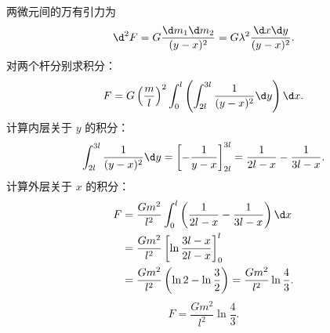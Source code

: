 \begin{solution}
    两微元间的万有引力为
    \begin{equation}
        \d^2 F = G \frac{\d m_1 \d m_2}{(y - x)^2} = G \lambda^2 \frac{\d x \d y}{(y - x)^2}.
    \end{equation}
    对两个杆分别求积分：
    \begin{equation}
        F = G \left(\frac{m}{l}\right)^2 \int_0^l \left( \int_{2l}^{3l} \frac{1}{(y - x)^2}\d y \right) \d x.
    \end{equation}
    计算内层关于 $y$ 的积分：
    \begin{equation}
        \int_{2l}^{3l} \frac{1}{(y - x)^2}\d y = \left[ -\frac{1}{y - x} \right]_{2l}^{3l} = \frac{1}{2l - x} - \frac{1}{3l - x}.
    \end{equation}
    计算外层关于 $x$ 的积分：
    \begin{equation}
        \begin{aligned}
            F & = \frac{G m^2}{l^2} \int_0^l \left( \frac{1}{2l - x} - \frac{1}{3l - x} \right) \d x          \\
              & = \frac{G m^2}{l^2} \left[ \ln\frac{3l - x}{2l - x} \right]_0^l                               \\
              & = \frac{G m^2}{l^2} \left( \ln 2 - \ln\frac{3}{2} \right) = \frac{G m^2}{l^2} \ln\frac{4}{3}.
        \end{aligned}
    \end{equation}
    \begin{equation}
        \boxed{F = \frac{G m^2}{l^2}\ln\frac{4}{3}.}
    \end{equation}
\end{solution}

\endinput
